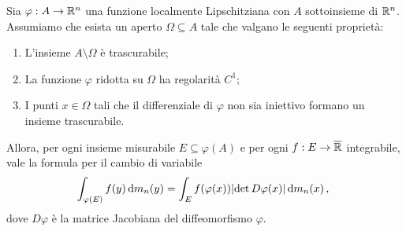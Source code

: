 \begin{corollary}\label{cor:CambioVariabileSporco}
	Sia $\varphi:A\to\mathbb R^n$ una funzione localmente Lipschitziana con $A$ sottoinsieme di $\mathbb R^n$.
	Assumiamo che esista un aperto $\Omega\subseteq A$ tale che valgano le seguenti proprietà:
	\begin{enumerate}
		\item L'insieme $A\setminus \Omega$ è trascurabile;
		\item La funzione $\varphi$ ridotta su $\Omega$ ha regolarità $C^1$;
		\item I punti $x\in\Omega$ tali che il differenziale di $\varphi$ non sia iniettivo formano un insieme trascurabile.
	\end{enumerate}
	
	Allora, per ogni insieme misurabile $E\subseteq \varphi(A)$ e per ogni $f:E\to\overline{\mathbb R}$ integrabile, vale la formula per il cambio di variabile
	\begin{equation*}
		\int_{\varphi(E)} f(y)\,\mathrm d m_n(y) = \int_{E} f(\varphi(x))\lvert \det D\varphi(x) \rvert \,\mathrm d m_n(x) \, \text{, }
	\end{equation*}
	dove $D\varphi$ è la matrice Jacobiana del diffeomorfismo $\varphi$.
\end{corollary}
